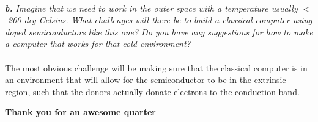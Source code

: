 \documentclass[letterpaper]{article}
\begin{document}
    \paragraph{}
    \textit{
        \textbf{b.} 
        Imagine that we need to work in the outer space with a temperature usually $<$ -200 deg Celsius. 
        What challenges will there be to build a classical computer using doped semiconductors like this one? 
        Do you have any suggestions for how to make a computer that works for that cold environment? 
        }
    
        \paragraph{}
The most obvious challenge will be making sure that the classical computer is in an environment that will allow for the semiconductor to be in the extrinsic region, such that the donors actually donate electrons to the conduction band.

    

\textbf{Thank you for an awesome quarter}
\end{document}
